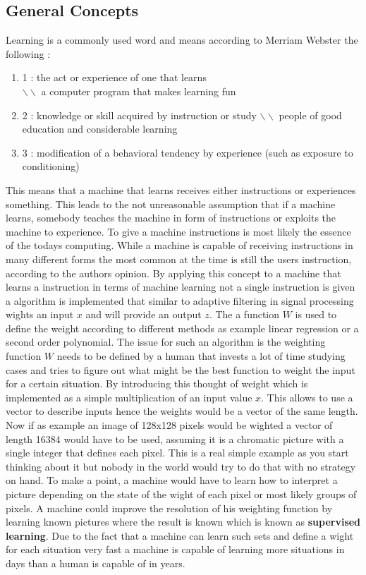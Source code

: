 \documentclass[conference]{IEEEtran}
\begin{document}
\subsection{General Concepts}\label{subsec: General Concepts}
Learning is a commonly used word and means according to Merriam Webster the following \cite{Learning}:
\begin{enumerate}
	\item[] 1 : the act or experience of one that learns\\
	$\backslash\backslash$ a computer program that makes learning fun
	\item[] 2 : knowledge or skill acquired by instruction or study
	$\backslash\backslash$ people of good education and considerable learning
	\item[] 3 : modification of a behavioral tendency by experience (such as exposure to conditioning)
\end{enumerate}
This means that a machine that learns receives either instructions or experiences something. This leads to the not unreasonable assumption that if a machine learns, somebody teaches the machine in form of instructions or exploits the machine to experience. To give  a machine instructions is most likely the essence of the todays computing. While a machine is capable of receiving instructions in many different forms the most common at the time is still the users instruction, according to the authors opinion. By applying this concept to a machine that learns a instruction in terms of machine learning not a single instruction is given a algorithm is implemented that similar to adaptive filtering in signal processing wights an input $x$ and will provide an output $z$. The a function $W$ is used to define the weight according to different methods as example linear regression or a second order polynomial. The issue for such an algorithm is the weighting function $W$ needs to be defined by a human that invests a lot of time studying cases and tries to figure out what might be the best function to weight the input for a certain situation. By introducing this thought of weight which is implemented as a simple multiplication of an input value $x$.  This allows to use a vector to describe inputs hence the weights would be a vector of the same length. Now if as example an image of 128x128 pixels would be wighted a vector of length 16384 would have to be used, assuming it is a chromatic picture with a single integer that defines each pixel. This is a real simple example as you start thinking about it but nobody in the world would try to do that with no strategy on hand. To make a point, a machine would have to learn how to interpret a picture depending on the state of the wight of each pixel or most likely groups of pixels. A machine could improve the resolution of his weighting function by learning known pictures where the result is known which is known as \textbf{supervised learning}. Due to the fact that a machine can learn such sets and define a wight for each situation very fast a machine is capable of learning more situations in days than a human is capable of in years.
\end{document}
